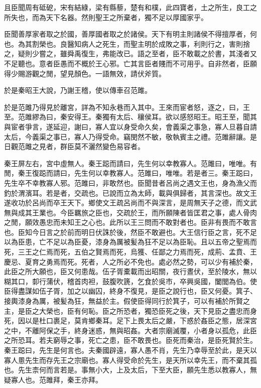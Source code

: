 且臣聞周有砥砨，宋有結綠，梁有縣藜，楚有和樸，此四寶者，土之所生，良工之所失也，而為天下名器。然則聖王之所棄者，獨不足以厚國家乎。

臣聞善厚家者取之於國，善厚國者取之於諸侯。天下有明主則諸侯不得擅厚者，何也。為其割榮也。良醫知病人之死生，而聖主明於成敗之事，利則行之，害則捨之，疑則少嘗之，雖舜禹復生，弗能改已。語之至者，臣不敢載之於書，其淺者又不足聽也。意者臣愚而不概於王心邪。亡其言臣者賤而不可用乎。自非然者，臣願得少賜游觀之閒，望見顏色。一語無效，請伏斧質。

於是秦昭王大說，乃謝王稽，使以傳車召范雎。

於是范雎乃得見於離宮，詳為不知永巷而入其中。王來而宦者怒，逐之，曰，王至。范雎繆為曰，秦安得王。秦獨有太后、穰侯耳。欲以感怒昭王。昭王至，聞其與宦者爭言，遂延迎，謝曰，寡人宜以身受命久矣，會義渠之事急，寡人旦暮自請太后，今義渠之事已，寡人乃得受命。竊閔然不敏，敬執賓主之禮。范雎辭讓。是日觀范雎之見者，群臣莫不灑然變色易容者。

秦王屏左右，宮中虛無人。秦王跽而請曰，先生何以幸教寡人。范雎曰，唯唯。有閒，秦王復跽而請曰，先生何以幸教寡人。范雎曰，唯唯。若是者三。秦王跽曰，先生卒不幸教寡人邪。范雎曰，非敢然也。臣聞昔者呂尚之遇文王也，身為漁父而釣於渭濱耳。若是者，交疏也。已說而立為太師，載與俱歸者，其言深也。故文王遂收功於呂尚而卒王天下。鄉使文王疏呂尚而不與深言，是周無天子之德，而文武無與成其王業也。今臣羈旅之臣也，交疏於王，而所願陳者皆匡君之事，處人骨肉之閒，願效愚忠而未知王之心也。此所以王三問而不敢對者也。臣非有畏而不敢言也。臣知今日言之於前而明日伏誅於後，然臣不敢避也。大王信行臣之言，死不足以為臣患，亡不足以為臣憂，漆身為厲被髪為狂不足以為臣恥。且以五帝之聖焉而死，三王之仁焉而死，五伯之賢焉而死，烏獲、任鄙之力焉而死，成荊、孟賁、王慶忌、夏育之勇焉而死。死者，人之所必不免也。處必然之勢，可以少有補於秦，此臣之所大願也，臣又何患哉。伍子胥橐載而出昭關，夜行晝伏，至於陵水，無以糊其口，厀行蒲伏，稽首肉袒，鼓腹吹篪，乞食於吳市，卒興吳國，闔閭為伯。使臣得盡謀如伍子胥，加之以幽囚，終身不復見，是臣之說行也，臣又何憂。箕子、接輿漆身為厲，被髪為狂，無益於主。假使臣得同行於箕子，可以有補於所賢之主，是臣之大榮也，臣有何恥。臣之所恐者，獨恐臣死之後，天下見臣之盡忠而身死，因以是杜口裹足，莫肯鄉秦耳。足下上畏太后之嚴，下惑於姦臣之態，居深宮之中，不離阿保之手，終身迷惑，無與昭姦。大者宗廟滅覆，小者身以孤危，此臣之所恐耳。若夫窮辱之事，死亡之患，臣不敢畏也。臣死而秦治，是臣死賢於生。秦王跽曰，先生是何言也。夫秦國辟遠，寡人愚不肖，先生乃幸辱至於此，是天以寡人慁先生而存先王之宗廟也。寡人得受命於先生，是天所以幸先王，而不棄其孤也。先生柰何而言若是。事無小大，上及太后，下至大臣，願先生悉以教寡人，無疑寡人也。范雎拜，秦王亦拜。


